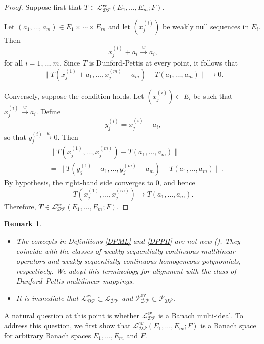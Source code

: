 \documentclass[12 pt]{article}%
\newtheorem{remark}[theorem]{Remark}
\newtheorem{final remark}[theorem]{Final Remark}
\begin{document}
\begin{proof}
	Suppose first that $T \in \mathcal{L_{DP}^{\text{ev}}}(E_1,\dots, E_m; F)$. 
	
	Let $(a_1,\dots,a_m)\in E_1\times\cdots\times E_m$ and let $(x_j^{(i)})$ be weakly null sequences in $E_i$. Then
	\[
	x_j^{(i)} + a_i \overset{w}{\longrightarrow} a_i,
	\]
	for all $i=1,\dots,m$. Since $T$ is Dunford-Pettis at every point, it follows that
	\[
	\|T(x_j^{(1)} + a_1,\dots, x_j^{(m)} + a_m) - T(a_1,\dots, a_m)\| \to 0.
	\]
	
	Conversely, suppose the condition holds. Let $(x_j^{(i)}) \subset E_i$ be such that $x_j^{(i)} \overset{w}{\longrightarrow} a_i$. Define
	\[
	y_j^{(i)} = x_j^{(i)} - a_i,
	\]
	so that $y_j^{(i)} \overset{w}{\longrightarrow} 0$. Then
	\begin{align*}
		&\|T(x_j^{(1)},\dots, x_j^{(m)}) - T(a_1,\dots, a_m)\| \\
		&= \|T(y_j^{(1)} + a_1,\dots, y_j^{(m)} + a_m) - T(a_1,\dots, a_m)\|.
	\end{align*}
	By hypothesis, the right-hand side converges to $0$, and hence
	\[
	T(x_j^{(1)},\dots, x_j^{(m)}) \to T(a_1,\dots, a_m).
	\]
	Therefore, $T \in \mathcal{L_{DP}^{\text{ev}}}(E_1,\dots, E_m; F)$.
\end{proof}

\begin{remark}\label{DPevcontDP}
	\begin{itemize}
		\item[(1)] The concepts in Definitions \ref{DPML} and \ref{DPPH} are not new (\cite{BT15, BT18}). They coincide with the classes of weakly sequentially continuous multilinear operators and weakly sequentially continuous homogeneous polynomials, respectively. We adopt this terminology for alignment with the class of Dunford–Pettis multilinear mappings.
		
		\item[(2)] It is immediate that $\mathcal{L_{DP}^{\mathrm{ev}}} \subset \mathcal{L_{DP}}$ and $\mathcal{P_{DP}^{\mathrm{ev}}} \subset \mathcal{P_{DP}}$.
	\end{itemize}
\end{remark}


A natural question at this point is whether $\mathcal{L_{DP}^{\mathrm{ev}}}$ is a Banach multi-ideal. To address this question, we first show that $\mathcal{L_{DP}^{\mathrm{ev}}}(E_1,\dots,E_m;F)$ is a Banach space for arbitrary Banach spaces $E_1,\dots,E_m$ and $F$.
\end{document}
